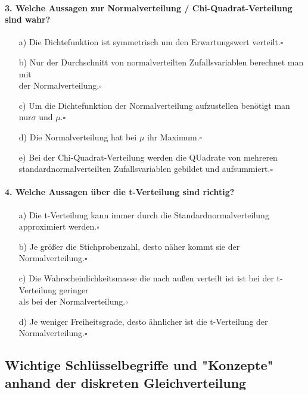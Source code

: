 \documentclass[a4paper]{article}
\begin{document}
\paragraph{3. Welche Aussagen zur Normalverteilung / Chi-Quadrat-Verteilung sind wahr?}
\begin{itemize}
    \item[a)]Die Dichtefunktion ist symmetrisch um den Erwartungswert verteilt.\hfill $\square$
    \item[b)]Nur der Durchschnitt von normalverteilten Zufallsvariablen berechnet man mit\\ der Normalverteilung.\hfill $\square$ 
    \item[c)]Um die Dichtefunktion der Normalverteilung aufzustellen benötigt man nur$\sigma$ und $\mu$.\hfill $\square$
    \item[d)]Die Normalverteilung hat bei $\mu$ ihr Maximum.\hfill $\square$
    \item[e)]Bei der Chi-Quadrat-Verteilung werden die QUadrate von mehreren\\ standardnormalverteilten Zufallsvariablen gebildet und aufsummiert.\hfill $\square$
\end{itemize}

\paragraph{4. Welche Aussagen über die t-Verteilung sind richtig?}
\begin{itemize}
    \item[a)]Die t-Verteilung kann immer durch die Standardnormalverteilung approximiert werden.\hfill $\square$
    \item[b)]Je größer die Stichprobenzahl, desto näher kommt sie der Normalverteilung.\hfill $\square$
    \item[c)]Die Wahrscheinlichkeitsmasse die nach außen verteilt ist ist bei der t-Verteilung geringer \\als bei der Normalverteilung.\hfill $\square$
    \item[d)]Je weniger Freiheitsgrade, desto ähnlicher ist die t-Verteilung der Normalverteilung.\hfill $\square$
\end{itemize}
\clearpage

\subsection{Wichtige Schlüsselbegriffe und "Konzepte" anhand der diskreten Gleichverteilung} \label{sec:concept}
\end{document}
